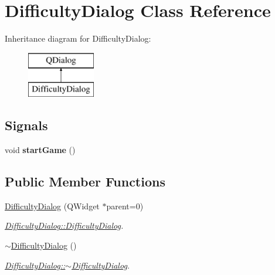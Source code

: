 \hypertarget{class_difficulty_dialog}{}\section{Difficulty\+Dialog Class Reference}
\label{class_difficulty_dialog}
Inheritance diagram for Difficulty\+Dialog\+:\begin{figure}[H]
\begin{center}
\leavevmode
\includegraphics[height=2.000000cm]{class_difficulty_dialog}
\end{center}
\end{figure}
\subsection*{Signals}
\begin{DoxyCompactItemize}
\item 
\hypertarget{class_difficulty_dialog_a679aa2992b14e1d1d13d71b1811cd2da}{}void {\bfseries start\+Game} ()\label{class_difficulty_dialog_a679aa2992b14e1d1d13d71b1811cd2da}

\end{DoxyCompactItemize}
\subsection*{Public Member Functions}
\begin{DoxyCompactItemize}
\item 
\hyperlink{class_difficulty_dialog_a306929965fd40117b7ad8cff31cad0cf}{Difficulty\+Dialog} (Q\+Widget $\ast$parent=0)
\begin{DoxyCompactList}\small\item\em \hyperlink{class_difficulty_dialog_a306929965fd40117b7ad8cff31cad0cf}{Difficulty\+Dialog\+::\+Difficulty\+Dialog}. \end{DoxyCompactList}\item 
\hypertarget{class_difficulty_dialog_a5fc0e40c7c1460e2acdafbdbb0888614}{}\hyperlink{class_difficulty_dialog_a5fc0e40c7c1460e2acdafbdbb0888614}{$\sim$\+Difficulty\+Dialog} ()\label{class_difficulty_dialog_a5fc0e40c7c1460e2acdafbdbb0888614}

\begin{DoxyCompactList}\small\item\em \hyperlink{class_difficulty_dialog_a5fc0e40c7c1460e2acdafbdbb0888614}{Difficulty\+Dialog\+::$\sim$\+Difficulty\+Dialog}. \end{DoxyCompactList}\end{DoxyCompactItemize}
